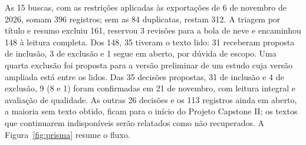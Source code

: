 \label{sec:res-revisao}

As 15 buscas, com as restrições aplicadas às exportações de 6 de novembro de 2026, somam 396 registros; sem as 84 duplicatas, restam 312. A triagem por título e resumo excluiu 161, reservou 3 revisões para a bola de neve e encaminhou 148 à leitura completa. Dos 148, 35 tiveram o texto lido: 31 receberam proposta de inclusão, 3 de exclusão e 1 segue em aberto, por dúvida de escopo. Uma quarta exclusão foi proposta para a versão preliminar de um estudo cuja versão ampliada está entre os lidos. Das 35 decisões propostas, 31 de inclusão e 4 de exclusão, 9 (8 e 1) foram confirmadas em 21 de novembro, com leitura integral e avaliação de qualidade. As outras 26 decisões e os 113 registros ainda em aberto, a maioria sem texto obtido, ficam para o início do Projeto Capstone II; os textos que continuarem indisponíveis serão relatados como não recuperados. A Figura~\ref{fig:prisma} resume o fluxo.

